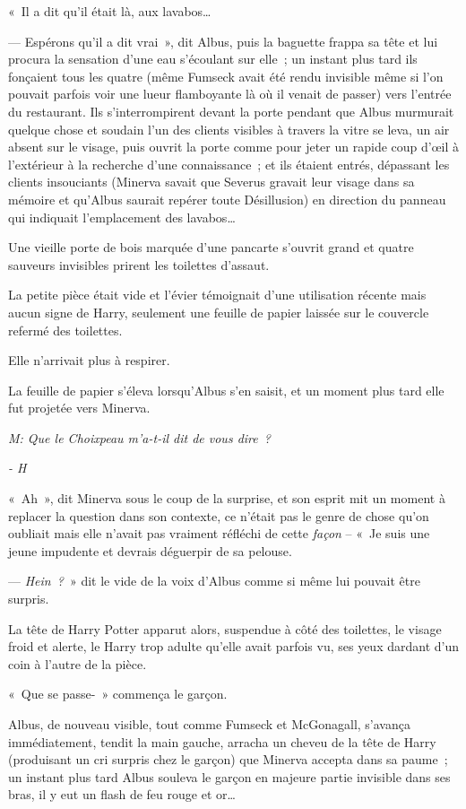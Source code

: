 «~Il a dit qu'il était là, aux lavabos…

--- Espérons qu'il a dit vrai~», dit Albus, puis la baguette frappa sa tête et lui procura la sensation d'une eau s'écoulant sur elle~; un instant plus tard ils fonçaient tous les quatre (même Fumseck avait été rendu invisible même si l'on pouvait parfois voir une lueur flamboyante là où il venait de passer) vers l'entrée du restaurant. Ils s'interrompirent devant la porte pendant que Albus murmurait quelque chose et soudain l'un des clients visibles à travers la vitre se leva, un air absent sur le visage, puis ouvrit la porte comme pour jeter un rapide coup d'œil à l'extérieur à la recherche d'une connaissance~; et ils étaient entrés, dépassant les clients insouciants (Minerva savait que Severus gravait leur visage dans sa mémoire et qu'Albus saurait repérer toute Désillusion) en direction du panneau qui indiquait l'emplacement des lavabos…

Une vieille porte de bois marquée d'une pancarte s'ouvrit grand et quatre sauveurs invisibles prirent les toilettes d'assaut.

La petite pièce était vide et l'évier témoignait d'une utilisation récente mais aucun signe de Harry, seulement une feuille de papier laissée sur le couvercle refermé des toilettes.

Elle n'arrivait plus à respirer.

La feuille de papier s'éleva lorsqu'Albus s'en saisit, et un moment plus tard elle fut projetée vers Minerva.

\emph{M: Que le Choixpeau m'a-t-il dit de vous dire~?}

\emph{- H}

«~Ah~», dit Minerva sous le coup de la surprise, et son esprit mit un moment à replacer la question dans son contexte, ce n'était pas le genre de chose qu'on oubliait mais elle n'avait pas vraiment réfléchi de cette \emph{façon} -- «~Je suis une jeune impudente et devrais déguerpir de sa pelouse.

--- \emph{Hein~?}~» dit le vide de la voix d'Albus comme si même lui pouvait être surpris.

La tête de Harry Potter apparut alors, suspendue à côté des toilettes, le visage froid et alerte, le Harry trop adulte qu'elle avait parfois vu, ses yeux dardant d'un coin à l'autre de la pièce.

«~Que se passe-~» commença le garçon.

Albus, de nouveau visible, tout comme Fumseck et McGonagall, s'avança immédiatement, tendit la main gauche, arracha un cheveu de la tête de Harry (produisant un cri surpris chez le garçon) que Minerva accepta dans sa paume~; un instant plus tard Albus souleva le garçon en majeure partie invisible dans ses bras, il y eut un flash de feu rouge et or…

